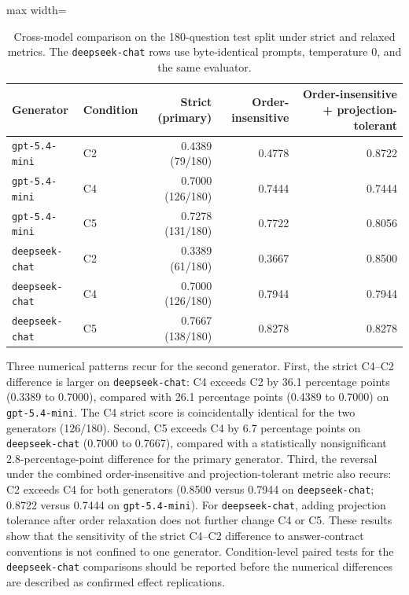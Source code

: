 \documentclass[cmc,article,submit,moreauthors,pdftex]{Definitions/tsp}
\begin{document}
\begin{table}[H]
\tablesize{\small}
\caption{Cross-model comparison on the 180-question test split under strict and relaxed metrics. The \texttt{deepseek-chat} rows use byte-identical prompts, temperature 0, and the same evaluator.}
\label{tab:second-model}
\centering
\begin{adjustbox}{max width=\textwidth}
\begin{tabular}{llrrr}
\toprule
\textbf{Generator} & \textbf{Condition} & \textbf{Strict (primary)} & \textbf{Order-insensitive} & \textbf{Order-insensitive + projection-tolerant} \\
\midrule
\texttt{gpt-5.4-mini} & C2 & 0.4389 (79/180) & 0.4778 & 0.8722 \\
\texttt{gpt-5.4-mini} & C4 & 0.7000 (126/180) & 0.7444 & 0.7444 \\
\texttt{gpt-5.4-mini} & C5 & 0.7278 (131/180) & 0.7722 & 0.8056 \\
\midrule
\texttt{deepseek-chat} & C2 & 0.3389 (61/180) & 0.3667 & 0.8500 \\
\texttt{deepseek-chat} & C4 & 0.7000 (126/180) & 0.7944 & 0.7944 \\
\texttt{deepseek-chat} & C5 & 0.7667 (138/180) & 0.8278 & 0.8278 \\
\bottomrule
\end{tabular}
\end{adjustbox}
\end{table}

Three numerical patterns recur for the second generator. First, the strict C4--C2 difference is larger on \texttt{deepseek-chat}: C4 exceeds C2 by 36.1 percentage points (0.3389 to 0.7000), compared with 26.1 percentage points (0.4389 to 0.7000) on \texttt{gpt-5.4-mini}. The C4 strict score is coincidentally identical for the two generators (126/180). Second, C5 exceeds C4 by 6.7 percentage points on \texttt{deepseek-chat} (0.7000 to 0.7667), compared with a statistically nonsignificant 2.8-percentage-point difference for the primary generator. Third, the reversal under the combined order-insensitive and projection-tolerant metric also recurs: C2 exceeds C4 for both generators (0.8500 versus 0.7944 on \texttt{deepseek-chat}; 0.8722 versus 0.7444 on \texttt{gpt-5.4-mini}). For \texttt{deepseek-chat}, adding projection tolerance after order relaxation does not further change C4 or C5. These results show that the sensitivity of the strict C4--C2 difference to answer-contract conventions is not confined to one generator. Condition-level paired tests for the \texttt{deepseek-chat} comparisons should be reported before the numerical differences are described as confirmed effect replications.
\end{document}
